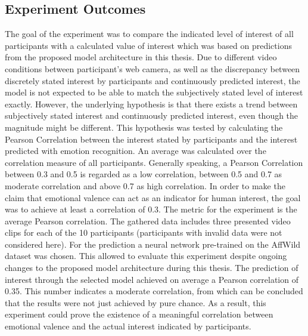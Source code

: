 \subsection{Experiment Outcomes}
The goal of the experiment was to compare the indicated level of interest of all participants with a calculated value of interest which was based on predictions from the proposed model architecture in this thesis.
\newline\newline
Due to different video conditions between participant's web camera, as well as the discrepancy between discretely stated interest by participants and continuously predicted interest, the model is not expected to be able to match the subjectively stated level of interest exactly. However, the underlying hypothesis is that there exists a trend between subjectively stated interest and continuously predicted interest, even though the magnitude might be different.
\newline\newline
This hypothesis was tested by calculating the Pearson Correlation between the interest stated by participants and the interest predicted with emotion recognition. An average was calculated over the correlation measure of all participants. 
\newline\newline
Generally speaking, a Pearson Correlation between 0.3 and 0.5 is regarded as a low correlation, between 0.5 and 0.7 as moderate correlation and above 0.7 as high correlation. In order to make the claim that emotional valence can act as an indicator for human interest, the goal was to achieve at least a correlation of 0.3.
\newline\newline
The metric for the experiment is the average Pearson correlation. The gathered data includes three presented video clips for each of the 10 participants (participants with invalid data were not considered here). For the prediction a neural network pre-trained on the AffWild dataset was chosen. This allowed to evaluate this experiment despite ongoing changes to the proposed model architecture during this thesis. The prediction of interest through the selected model achieved on average a Pearson correlation of 0.35. This number indicates a moderate correlation, from which can be concluded that the results were not just achieved by pure chance. As a result, this experiment could prove the existence of a meaningful correlation between emotional valence and the actual interest indicated by participants.
